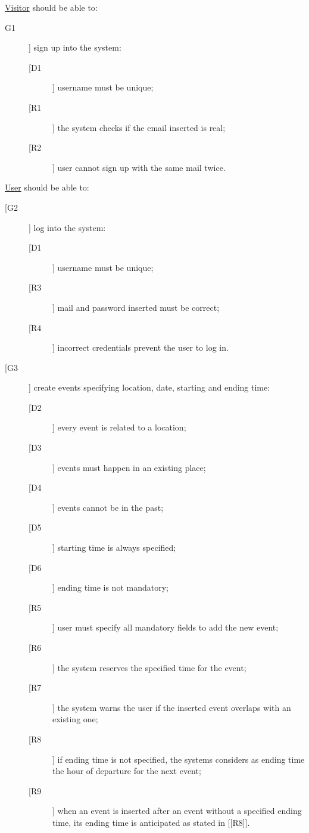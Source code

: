 \underline{Visitor} should be able to:
\begin{description}
\item[G1]] sign up into the system:
	\begin{description}
	\item[[D1]] username must be unique;
	\newline
	\item[[R1]] the system checks if the email inserted is real;
	\item[[R2]] user cannot sign up with the same mail twice.
	\end{description}
\end{description}

\noindent\underline{User} should be able to:
\begin{description}
\item[[G2]] log into the system:
	\begin{description}
	\item[[D1]] username must be unique;
	\newline
	\item[[R3]] mail and password inserted must be correct;
	\item[[R4]] incorrect credentials prevent the user to log in.
	\end{description}
\item[[G3]] create events specifying location, date, starting and ending time:
	\begin{description}
	\item[[D2]] every event is related to a location;
	\item[[D3]] events must happen in an existing place;
	\item[[D4]] events cannot be in the past;
	\item[[D5]] starting time is always specified;
	\item[[D6]] ending time is not mandatory;
	\newline
	\item[[R5]] user must specify all mandatory fields to add the new event;
	\item[[R6]] the system reserves the specified time for the event;
	\item[[R7]] the system warns the user if the inserted event overlaps with an existing one;
	\item[[R8]] if ending time is not specified, the systems considers as ending time the hour of departure for the next event;
	\item[[R9]] when an event is inserted after an event without a specified ending time, its ending time is anticipated as stated in [[R8]].

\end{description}
\end{description}
